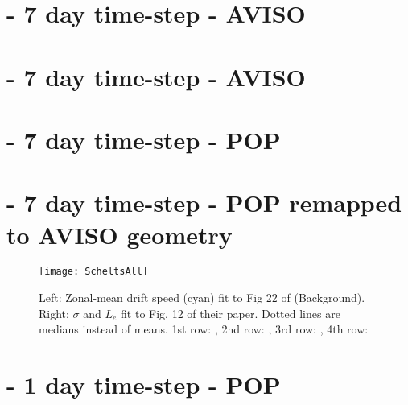
\section{\MI\;- 7 day time-step - AVISO}
\label{section:aviI}

\FloatBarrier

\section{\MII\;- 7 day time-step - AVISO}
\label{section:aviII}

\FloatBarrier

\section{\MII\;- 7 day time-step - POP}
\label{section:pop7II}

\FloatBarrier

\section{\MII\;- 7 day time-step - POP remapped to AVISO geometry}
\label{section:p2aII}

\FloatBarrier


\begin{figure}
\texttt{[image: ScheltsAll]}
\caption{
Left: Zonal-mean drift speed (cyan) fit to Fig 22 of  (Background).
Right: $\sigma$ and $L_{e}$ fit to Fig. 12 of their paper. Dotted lines are medians instead of means.
1st row: \protect{\aviII},
2nd row: \protect{\aviI},
3rd row: \protect{\pToaII},
4th row: \protect{\popSevenII}
}
\label{fig:ScheltsAll}
\end{figure}


\section{\MII\;- 1 day time-step - POP}
\label{section:pop1ISO}
